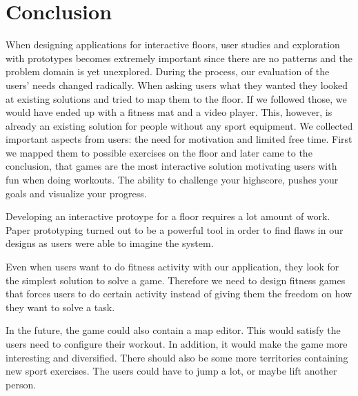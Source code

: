 \documentclass{sigchi}
\begin{document}
\section{Conclusion}

  When designing applications for interactive floors, user studies and exploration with prototypes becomes extremely important since there are no patterns and the problem domain is yet unexplored. During the process, our evaluation of the users' needs changed radically. When asking users what they wanted they looked at existing solutions and tried to map them to the floor. If we followed those, we would have ended up with a fitness mat and a video player. This, however, is already an existing solution for people without any sport equipment. We collected important aspects from users: the need for motivation and limited free time. First we mapped them to possible exercises on the floor and later came to the conclusion, that games are the most interactive solution motivating users with fun when doing workouts. The ability to challenge your highscore, pushes your goals and visualize your progress. 

  Developing an interactive protoype for a floor requires a lot amount of work. Paper prototyping turned out to be a powerful tool in order to find flaws in our designs as users were able to imagine the system.

  Even when users want to do fitness activity with our application, they look for the simplest solution to solve a game. Therefore we need to design fitness games that forces users to do certain activity instead of giving them the freedom on how they want to solve a task.

  In the future, the game could also contain a map editor. This would satisfy the users need to configure their workout. In addition, it would make the game more interesting and diversified. There should also be some more territories containing new sport exercises. The users could have to jump a lot, or maybe lift another person.
\end{document}
